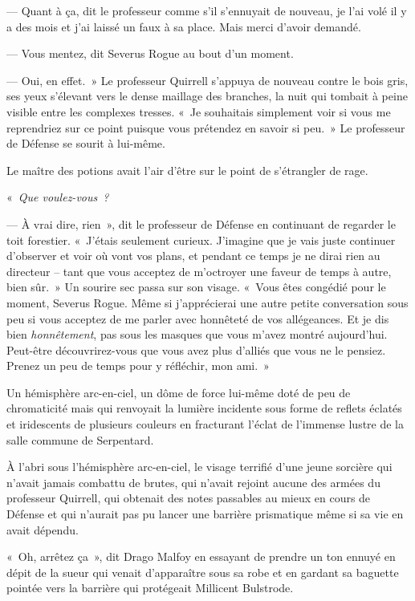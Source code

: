 --- Quant à ça, dit le professeur comme s'il s'ennuyait de nouveau, je l'ai volé il y a des mois et j'ai laissé un faux à sa place.
Mais merci d'avoir demandé.

--- Vous mentez, dit Severus Rogue au bout d'un moment.

--- Oui, en effet.~»
Le professeur Quirrell s'appuya de nouveau contre le bois gris, ses yeux s'élevant vers le dense maillage des branches, la nuit qui tombait à peine visible entre les complexes tresses.
«~Je souhaitais simplement voir si vous me reprendriez sur ce point puisque vous prétendez en savoir si peu.~»
Le professeur de Défense se sourit à lui-même.

Le maître des potions avait l'air d'être sur le point de s'étrangler de rage.

«~\emph{Que voulez-vous~?}

--- À vrai dire, rien~», dit le professeur de Défense en continuant de regarder le toit forestier.
«~J'étais seulement curieux.
J'imagine que je vais juste continuer d'observer et voir où vont vos plans, et pendant ce temps je ne dirai rien au directeur -- tant que vous acceptez de m'octroyer une faveur de temps à autre, bien sûr.~»
Un sourire sec passa sur son visage.
«~Vous êtes congédié pour le moment, Severus Rogue.
Même si j'apprécierai une autre petite conversation sous peu si vous acceptez de me parler avec honnêteté de vos allégeances.
Et je dis bien \emph{honnêtement}, pas sous les masques que vous m'avez montré aujourd'hui.
Peut-être découvrirez-vous que vous avez plus d'alliés que vous ne le pensiez.
Prenez un peu de temps pour y réfléchir, mon ami.~»


Un hémisphère arc-en-ciel, un dôme de force lui-même doté de peu de chromaticité mais qui renvoyait la lumière incidente sous forme de reflets éclatés et iridescents de plusieurs couleurs en fracturant l'éclat de l'immense lustre de la salle commune de Serpentard.

À l'abri sous l'hémisphère arc-en-ciel, le visage terrifié d'une jeune sorcière qui n'avait jamais combattu de brutes, qui n'avait rejoint aucune des armées du professeur Quirrell, qui obtenait des notes passables au mieux en cours de Défense et qui n'aurait pas pu lancer une barrière prismatique même si sa vie en avait dépendu.

«~Oh, arrêtez ça~», dit Drago Malfoy en essayant de prendre un ton ennuyé en dépit de la sueur qui venait d'apparaître sous sa robe et en gardant sa baguette pointée vers la barrière qui protégeait Millicent Bulstrode.

